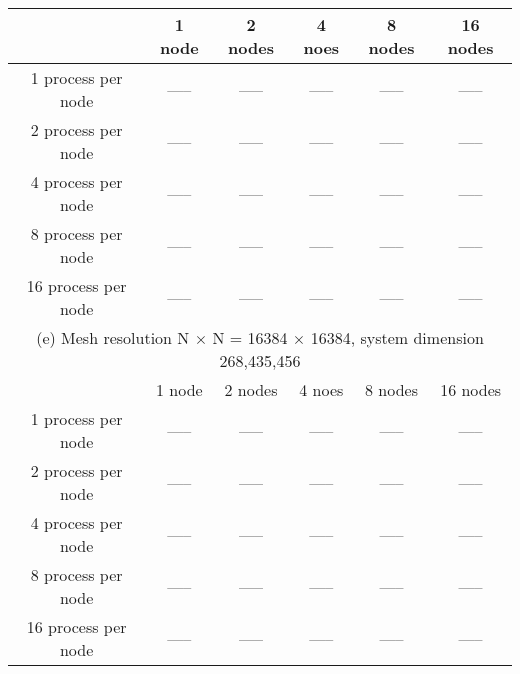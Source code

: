 \documentclass[11pt]{article}
\begin{document}
\begin{table}[!htbp]
{\begin{tabular}{ |c|c|c|c|c|c| }
\hline
 & 1 node & 2 nodes & 4 noes & 8 nodes & 16 nodes \\
\hline
1 process per node  & ----- & ----- & ----- & ----- & ----- \\
2 process per node  & ----- & ----- & ----- & ----- & ----- \\
4 process per node  & ----- & ----- & ----- & ----- & ----- \\
8 process per node  & ----- & ----- & ----- & ----- & ----- \\
16 process per node & ----- & ----- & ----- & ----- & ----- \\
\hline
\hline
\multicolumn{6}{|c|}{(e) Mesh resolution N $\times$ N = 16384 $\times$ 16384, system dimension 268,435,456}\\
\hline
 & 1 node & 2 nodes & 4 noes & 8 nodes & 16 nodes \\
\hline
1 process per node  & ----- & ----- & ----- & ----- & ----- \\
2 process per node  & ----- & ----- & ----- & ----- & ----- \\
4 process per node  & ----- & ----- & ----- & ----- & ----- \\
8 process per node  & ----- & ----- & ----- & ----- & ----- \\
16 process per node & ----- & ----- & ----- & ----- & ----- \\
\hline
\end{tabular}
}
\end{table}

\begin{table}[!htbp]
\end{table}
\pagebreak
\end{document}
